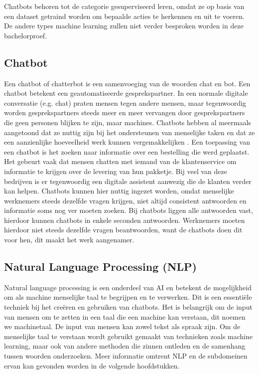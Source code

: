 Chatbots behoren tot de categorie gesuperviseerd leren, omdat ze op basis van een dataset getraind worden om bepaalde acties te herkennen en uit te voeren. De andere types machine learning zullen niet verder besproken worden in deze bachelorproef.

\subsection{Chatbot}
\label{subsec:begrippen-chatbot}

Een chatbot of chatterbot is een samenvoeging van de woorden chat en bot. Een chatbot betekent een geautomatiseerde gesprekspartner. In een normale digitale conversatie (e.g. chat) praten mensen tegen andere mensen, maar tegenwoordig worden gesprekspartners steeds meer en meer vervangen door gesprekspartners die geen personen blijken te zijn, maar machines. Chatbots hebben al meermaals aangetoond dat ze nuttig zijn bij het ondersteunen van menselijke taken en dat ze een aanzienlijke hoeveelheid werk kunnen vergemakkelijken \autocite{Atwell2007}. Een toepassing van een chatbot is het zoeken naar informatie over een bestelling die werd geplaatst. Het gebeurt vaak dat mensen chatten met iemand van de klantenservice om informatie te krijgen over de levering van hun pakketje. Bij veel van deze bedrijven is er tegenwoordig een digitale assistent aanwezig die de klanten verder kan helpen. Chatbots kunnen hier nuttig ingezet worden, omdat menselijke werknemers steeds dezelfde vragen krijgen, niet altijd consistent antwoorden en informatie soms nog ver moeten zoeken. Bij chatbots liggen alle antwoorden vast, hierdoor kunnen chatbots in enkele seconden antwoorden. Werknemers moeten hierdoor niet steeds dezelfde vragen beantwoorden, want de chatbots doen dit voor hen, dit maakt het werk aangenamer. 

\subsection{Natural Language Processing (NLP)}
\label{subsec:begrippen-nlp}


Natural language processing is een onderdeel van AI en betekent de mogelijkheid om als machine menselijke taal te begrijpen en te verwerken. Dit is een essentiële techniek bij het creëren en gebruiken van chatbots. Het is belangrijk om de input van mensen om te zetten in een taal die een machine kan verstaan, dit noemen we machinetaal. De input van mensen kan zowel tekst als spraak zijn. Om de menselijke taal te verstaan wordt gebruikt gemaakt van technieken zoals machine learning, maar ook van andere methoden die zinnen  ontleden en de samenhang tussen woorden onderzoeken. Meer informatie omtrent NLP en de subdomeinen ervan kan gevonden worden in de volgende hoofdstukken.


